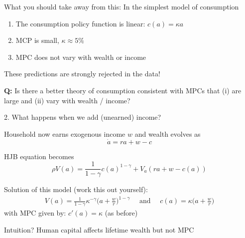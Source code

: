 \documentclass[11pt, aspectratio=169]{beamer}
\newenvironment{witemize}{\itemize\addtolength{\itemsep}{10pt}}{\enditemize}
\begin{document}
\begin{frame}{}

What you should take away from this: In the simplest model of consumption 

\vspace{4mm}
\begin{enumerate}
\item The consumption policy function is linear: $c(a) = \kappa a$

\item MCP is small, $\kappa \approx 5\%$

\item MPC does not vary with wealth or income
\end{enumerate}

\vspace{4mm}
These predictions are strongly rejected in the data!

\vspace{6mm}
\textbf{Q:} Is there a better theory of consumption consistent with MPCs that (i) are large and (ii) vary with wealth / income?
\end{frame}


\begin{frame}{2. What happens when we add (unearned) income?}

\begin{witemize}
\item Household now earns exogenous income $w$ and wealth evolves as
\begin{equation*}
	\dot a = ra + w - c
\end{equation*}

\item HJB equation becomes
\begin{equation*}
	\rho V(a) = \frac{1}{1-\gamma} c(a)^{1-\gamma} + V_a (r a + w - c(a))
\end{equation*}

\item Solution of this model (work this out yourself):
\begin{align*}
	V(a) = \frac{1}{1-\gamma} \kappa^{-\gamma} \Big( a + \frac{w}{r} \Big)^{1-\gamma} 
	\quad \text{ and } \quad
	c(a) = \kappa \Big(a + \frac{w}{r} \Big)
\end{align*}
with MPC given by: $c'(a) = \kappa$ (as before)

\item Intuition? Human capital affects lifetime wealth but not MPC
\end{witemize}
\end{frame}
\end{document}
